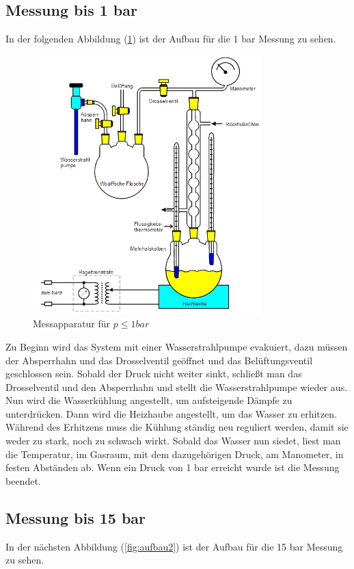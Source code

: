 \subsection{Messung bis 1 bar}
In der folgenden Abbildung (\ref{fig:aufbau1}) ist der Aufbau für die 1 bar Messung
zu sehen.

\begin{figure}
  \centering
  \includegraphics[height=10cm]{Aufbau1.jpg}
  \caption{Messapparatur für $p ≤ 1 bar$}
  \label{fig:aufbau1}
\end{figure}

Zu Beginn wird das System mit einer Wasserstrahlpumpe evakuiert, dazu müssen der
Absperrhahn und das Drosselventil geöffnet und das Belüftungsventil geschlossen sein.
Sobald der Druck nicht weiter sinkt, schließt man das Drosselventil und den
Absperrhahn und stellt die Wasserstrahlpumpe wieder aus. Nun wird die Wasserkühlung
angestellt, um aufsteigende Dämpfe zu unterdrücken. Dann wird die Heizhaube angestellt,
um das Wasser zu erhitzen. Während des Erhitzens muss die Kühlung ständig neu
reguliert werden, damit sie weder zu stark, noch zu schwach wirkt.
Sobald das Wasser nun siedet, liest man die Temperatur, im Gasraum,
mit dem dazugehörigen Druck, am Manometer, in festen Abständen ab.
Wenn ein Druck von 1 bar erreicht wurde ist die Messung beendet.

\subsection{Messung bis 15 bar}
In der nächsten Abbildung (\ref{fig:aufbau2}) ist der Aufbau für die 15 bar Messung
zu sehen.

